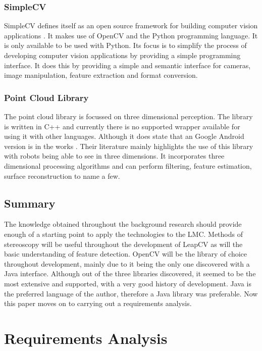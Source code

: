 \documentclass[11pt,oneside]{report}
\begin{document}
					\subsection{SimpleCV}
						SimpleCV defines itself as an open source framework for building computer vision applications \cite{code:simplecv}.
						It makes use of OpenCV and the Python programming language.
						It is only available to be used with Python.
						Its focus is to simplify the process of developing computer vision applications by providing a simple programming interface.
						It does this by providing a simple and semantic interface for cameras, image manipulation, feature extraction and format conversion.
					\subsection{Point Cloud Library}
						The point cloud library is focussed on three dimensional perception.
						The library is written in C++ and currently there is no supported wrapper available for using it with other languages.
						Although it does state that an Google Android version is in the works \cite{journal:pcl}.
						Their literature mainly highlights the use of this library with robots being able to see in three dimensions.
						It incorporates three dimensional processing algorithms and can perform filtering, feature estimation, surface reconstruction to name a few.
						
				\section{Summary}
					The knowledge obtained throughout the background research should provide enough of a starting point to apply the technologies to the LMC.
					Methods of stereoscopy will be useful throughout the development of LeapCV as will the basic understanding of feature detection.
					OpenCV will be the library of choice throughout development, mainly due to it being the only one discovered with a Java interface.
					Although out of the three libraries discovered, it seemed to be the most extensive and supported, with a very good history of development.
					Java is the preferred language of the author, therefore a Java library was preferable.
					Now this paper moves on to carrying out a requirements analysis.
	\chapter{Requirements Analysis}\label{chap:req}
\end{document}
